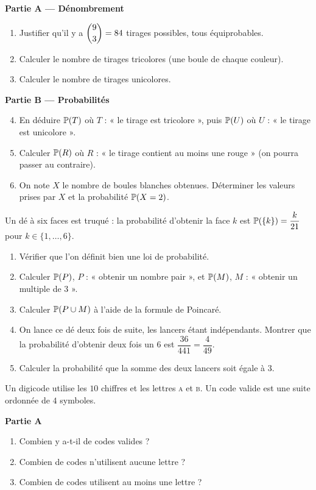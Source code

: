 \textbf{Partie A — Dénombrement}
\begin{enumerate}
	\item Justifier qu'il y a $\dbinom{9}{3}=84$ tirages possibles, tous
	équiprobables.
	\item Calculer le nombre de tirages tricolores (une boule de chaque
	couleur).
	\item Calculer le nombre de tirages unicolores.
\end{enumerate}

\textbf{Partie B — Probabilités}
\begin{enumerate}
	\setcounter{enumi}{3}
	\item En déduire $\mathbb{P}(T)$ où $T$ : « le tirage est tricolore », puis
	$\mathbb{P}(U)$ où $U$ : « le tirage est unicolore ».
	\item Calculer $\mathbb{P}(R)$ où $R$ : « le tirage contient au moins une
	rouge » (on pourra passer au contraire).
	\item On note $X$ le nombre de boules blanches obtenues. Déterminer les
	valeurs prises par $X$ et la probabilité $\mathbb{P}(X=2)$.
\end{enumerate}

Un dé à six faces est truqué : la probabilité d'obtenir la face $k$ est
$\mathbb{P}(\{k\})=\dfrac{k}{21}$ pour $k\in\{1,\ldots,6\}$.
\begin{enumerate}
	\item Vérifier que l'on définit bien une loi de probabilité.
	\item Calculer $\mathbb{P}(P)$, $P$ : « obtenir un nombre pair », et
	$\mathbb{P}(M)$, $M$ : « obtenir un multiple de $3$ ».
	\item Calculer $\mathbb{P}(P\cup M)$ à l'aide de la formule de Poincaré.
	\item On lance ce dé deux fois de suite, les lancers étant indépendants.
	Montrer que la probabilité d'obtenir deux fois un $6$ est
	$\dfrac{36}{441}=\dfrac{4}{49}$.
	\item Calculer la probabilité que la somme des deux lancers soit égale à
	$3$.
\end{enumerate}

Un digicode utilise les $10$ chiffres et les lettres \textsc{a} et
\textsc{b}. Un code valide est une suite ordonnée de $4$ symboles.

\textbf{Partie A}
\begin{enumerate}
	\item Combien y a-t-il de codes valides ?
	\item Combien de codes n'utilisent aucune lettre ?
	\item Combien de codes utilisent au moins une lettre ?
\end{enumerate}

